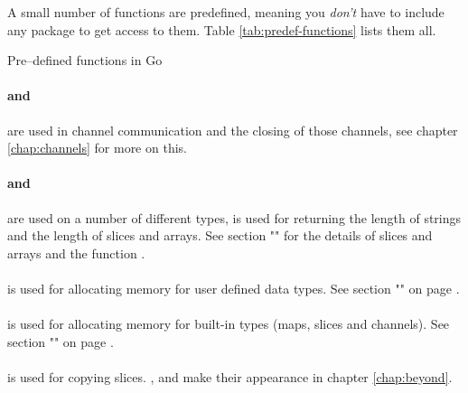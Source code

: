 A small number of functions are predefined, meaning 
you \emph{don't} have to include any package to get
access to them. Table \ref{tab:predef-functions} lists them all.

\begin{table}[H]
\begin{center}
\caption{Pre--defined functions in Go}
\label{tab:predef-functions}

\end{center}
\end{table}

\paragraph{ and } are used in
channel communication and the closing of those channels, see chapter \ref{chap:channels}
for more on this.

\paragraph{ and } are used on a number of different
types,  is
used for returning the length of strings and the length of slices and
arrays. See section "" for the details of slices and
arrays and the function
.

\paragraph{} is used for allocating memory for user defined
data types. See section "" on page
\pageref{sec:allocation with new}.

\paragraph{} is used for allocating memory for built-in
types (maps, slices and channels). See section 
"" on page
\pageref{sec:allocation with make}.

\paragraph{} is used for copying slices. ,
 and  make their appearance in chapter
\ref{chap:beyond}.

